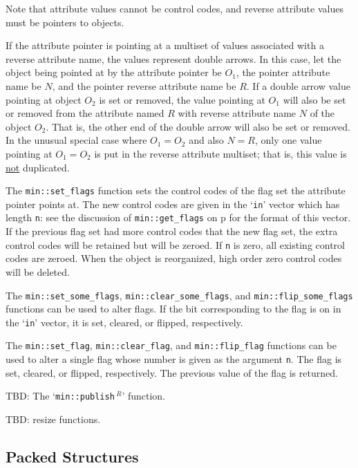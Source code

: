 \documentclass[12pt]{article}
\newcommand{\pagref}[1]{p\pageref{#1}}
\newcommand{\EOL}{\penalty \exhyphenpenalty}
\newcommand{\REL}{$\,^R$}
\begin{document}
Note that attribute values cannot be control codes, and reverse attribute
values must be pointers to objects.

If the attribute pointer is pointing at a multiset of values
associated with a reverse attribute name,
the values represent double arrows.
In this case, let the object being pointed at by the attribute pointer be $O_1$,
the pointer attribute name be $N$, and the pointer reverse
attribute name be $R$.
If a double arrow value pointing at object $O_2$ is set or removed, the value
pointing at $O_1$ will also be set or removed from the attribute named
$R$ with
reverse attribute name $N$ of the object $O_2$.  That is, the other end of
the double arrow will also be set or removed.
In the unusual special case where $O_1=O_2$ and also $N=R$, only one value
pointing at $O_1=O_2$ is put in the reverse attribute multiset; that
is, this value is \underline{not} duplicated.

The {\tt min::\EOL set\_\EOL flags} function sets the control codes
of the flag set the attribute pointer points at.
The new control codes are given in the `{\tt in}' vector which
has length {\tt n}: see the discussion of
{\tt min::\EOL get\_\EOL flags} on \pagref{MIN::GET_FLAGS_OF_ATTR}
for the format of this vector.
If the previous flag set had more control codes that the new flag
set, the extra control codes will be retained but will be zeroed.
If {\tt n} is zero, all existing control codes are zeroed.
When the object is reorganized, high order zero control codes will
be deleted.

The {\tt min::\EOL set\_\EOL some\_\EOL flags},
{\tt min::\EOL clear\_\EOL some\_\EOL flags},
and {\tt min::\EOL flip\_\EOL some\_\EOL flags}
functions can be used to alter flags.  If the bit corresponding
to the flag is on in the `{\tt in}' vector, it is set, cleared,
or flipped, respectively.

The {\tt min::\EOL set\_\EOL flag},
{\tt min::\EOL clear\_\EOL flag},
and {\tt min::\EOL flip\_\EOL flag}
functions can be used to alter a single flag whose number is
given as the argument {\tt n}.  The flag is set, cleared,
or flipped, respectively.  The previous value of the flag is
returned.

TBD: The `{\tt min::\EOL publish\REL}' function.\label{MIN::PUBLISH}

TBD: resize functions\label{MIN::RESIZE_OF_ATTR}.

\subsection{Packed Structures}
\label{PACKED-STRUCTURES}
\end{document}
